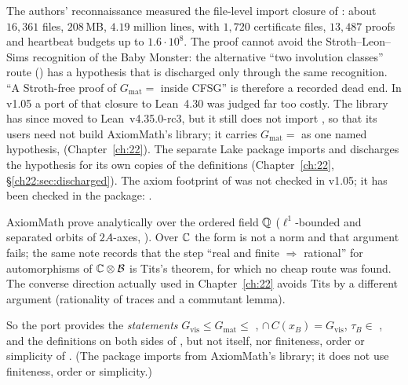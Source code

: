 \begin{warning}[title={Dead end: porting \texttt{gmat\_eq\_griess} to Lean 4.30}]
The authors' reconnaissance measured the file-level import closure
of : about $16{,}361$ files, $208$\,MB, $4.19$ million lines, with $1{,}720$
certificate files, $13{,}487$  proofs and heartbeat budgets up to $1.6\cdot10^8$.
The proof cannot avoid the Stroth--Leon--Sims recognition of the Baby Monster: the alternative
``two involution classes'' route () has a hypothesis that is discharged only
through the same recognition.  ``A Stroth-free proof of $G_{\mathrm{mat}}=$  inside CFSG'' is
therefore a recorded dead end.  In v1.05 a port of that closure to Lean~4.30 was judged far too costly.  The library has
since moved to Lean~v4.35.0-rc3, but it still does not import , so that its users need not build
AxiomMath's library; it carries $G_{\mathrm{mat}}=$  as one named hypothesis, 
(Chapter~\ref{ch:22}).  The separate Lake package  imports  and discharges the
hypothesis for its own copies of the definitions (Chapter~\ref{ch:22}, \S\ref{ch22:sec:discharged}).  The axiom footprint of
 was not checked in v1.05; it has been checked in the package: .
\end{warning}

\begin{warning}[title={Recorded diagnosis: AxiomMath's finiteness proof does not transfer to $\mathbb C$}]
AxiomMath prove  analytically over the ordered field ${\mathbb{Q}}$ ($\ell^1$-bounded and
separated orbits of $2A$-axes, ).  Over ${\mathbb{C}}$ the form is not a norm
and that argument fails; the same note records that the step ``real and finite
$\Rightarrow$ rational'' for automorphisms of ${\mathbb{C}}\otimes\mathcal{B}$ is Tits's theorem, for which no cheap
route was found.  The converse direction actually used in Chapter~\ref{ch:22} avoids Tits by a
different argument (rationality of traces and a commutant lemma).
\end{warning}

So the port provides the \emph{statements} $G_{\mathrm{vis}}\le G_{\mathrm{mat}}\le$ ,
 $\cap\,C(x_B)=G_{\mathrm{vis}}$, $\tau_B\in$ , and the definitions on both sides
of , but not  itself, nor finiteness, order or simplicity of
.  (The package  imports  from AxiomMath's library; it does not use
finiteness, order or simplicity.)


